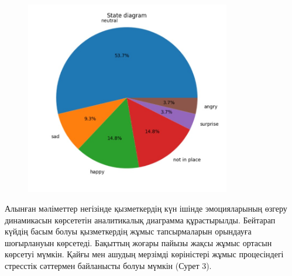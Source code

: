 \begin{figure}[H]
	\centering
	\includegraphics[width=0.8\textwidth]{media/ict2/image159}
	\caption*{}
\end{figure}


Алынған мәліметтер негізінде қызметкердің күн ішінде эмоцияларының
өзгеру динамикасын көрсететін аналитикалық диаграмма құрастырылды.
Бейтарап күйдің басым болуы қызметкердің жұмыс тапсырмаларын орындауға
шоғырлануын көрсетеді. Бақыттың жоғары пайызы жақсы жұмыс ортасын
көрсетуі мүмкін. Қайғы мен ашудың мерзімді көріністері жұмыс
процесіндегі стресстік сәттермен байланысты болуы мүмкін (Сурет 3).

